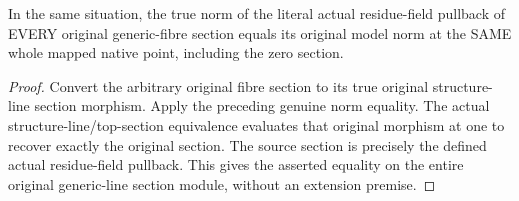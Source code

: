 \begin{corollary}
\label{berkovich:actual-generic-section-model-norm-pullback}
\leanok
{}
In the same situation, the true norm of the literal actual residue-field
pullback of EVERY original generic-fibre section equals its original model
norm at the SAME whole mapped native point, including the zero section.
\end{corollary}
\begin{proof}
Convert the arbitrary original fibre section to its true original structure-line
section morphism. Apply the preceding genuine norm equality. The actual
structure-line/top-section equivalence evaluates that original morphism at
one to recover exactly the original section. The source section is precisely
the defined actual residue-field pullback. This gives the asserted equality
on the entire original generic-line section module, without an extension premise.
\end{proof}
